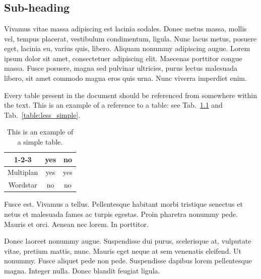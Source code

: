 \chapter{}

\section{Sub-heading}

Vivamus vitae massa adipiscing est lacinia sodales. Donec metus massa, mollis vel, tempus placerat, vestibulum condimentum, ligula. Nunc lacus metus, posuere eget, lacinia eu, varius quis, libero. Aliquam nonummy adipiscing augue. Lorem ipsum dolor sit amet, consectetuer adipiscing elit. Maecenas porttitor congue massa. Fusce posuere, magna sed pulvinar ultricies, purus lectus malesuada libero, sit amet commodo magna eros quis urna. Nunc viverra imperdiet enim.

Every table present in the document should be referenced from somewhere within the text. This is an example of a reference to a table: see Tab.~\ref{table:simple} and Tab.~\ref{table:less_simple}.

\begin{table}
\centering
\begin{tabular}{|c|c|c|}
\hline
1-2-3 & yes & no \\
\hline
Multiplan & yes & yes \\
\hline
Wordstar & no & no \\
\hline
\end{tabular}
\caption{This is an example of a simple table.}
\label{table:simple}
\end{table}

Fusce est. Vivamus a tellus. Pellentesque habitant morbi tristique senectus et netus et malesuada fames ac turpis egestas. Proin pharetra nonummy pede. Mauris et orci. Aenean nec lorem. In porttitor.\par

Donec laoreet nonummy augue. Suspendisse dui purus, scelerisque at, vulputate vitae, pretium mattis, nunc. Mauris eget neque at sem venenatis eleifend. Ut nonummy. Fusce aliquet pede non pede. Suspendisse dapibus lorem pellentesque magna. Integer nulla. Donec blandit feugiat ligula.\par


